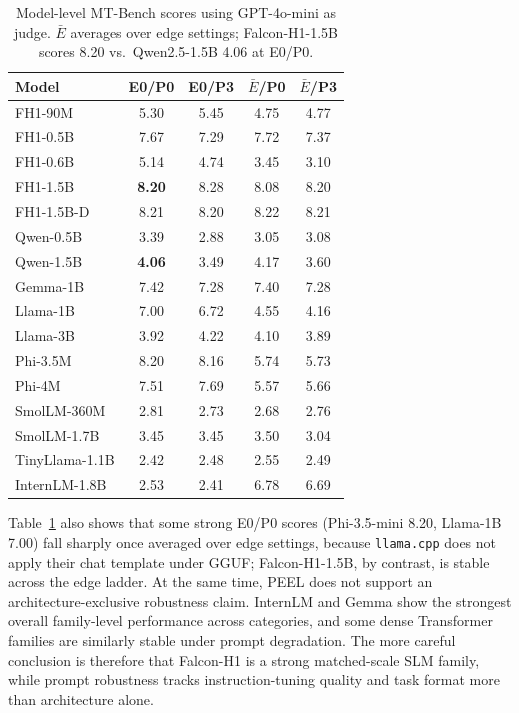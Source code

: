 \documentclass[letterpaper]{article} %
\begin{document}
\begin{table}[t]
\centering
\small
\setlength{\tabcolsep}{4pt}
\renewcommand{\arraystretch}{0.92}

\begin{tabular}{@{}lcccc@{}}
\toprule
Model & E0/P0 & E0/P3 & $\bar{E}$/P0 & $\bar{E}$/P3 \\
\midrule
FH1-90M        & 5.30 & 5.45 & 4.75 & 4.77 \\
FH1-0.5B       & 7.67 & 7.29 & 7.72 & 7.37 \\
FH1-0.6B       & 5.14 & 4.74 & 3.45 & 3.10 \\
FH1-1.5B       & \textbf{8.20} & 8.28 & 8.08 & 8.20 \\
FH1-1.5B-D     & 8.21 & 8.20 & 8.22 & 8.21 \\
Qwen-0.5B      & 3.39 & 2.88 & 3.05 & 3.08 \\
Qwen-1.5B      & \textbf{4.06} & 3.49 & 4.17 & 3.60 \\
Gemma-1B       & 7.42 & 7.28 & 7.40 & 7.28 \\
Llama-1B       & 7.00 & 6.72 & 4.55 & 4.16 \\
Llama-3B       & 3.92 & 4.22 & 4.10 & 3.89 \\
Phi-3.5M       & 8.20 & 8.16 & 5.74 & 5.73 \\
Phi-4M         & 7.51 & 7.69 & 5.57 & 5.66 \\
SmolLM-360M    & 2.81 & 2.73 & 2.68 & 2.76 \\
SmolLM-1.7B    & 3.45 & 3.45 & 3.50 & 3.04 \\
TinyLlama-1.1B & 2.42 & 2.48 & 2.55 & 2.49 \\
InternLM-1.8B  & 2.53   & 2.41   & 6.78 & 6.69 \\
\bottomrule
\end{tabular}
\caption{Model-level MT-Bench scores using GPT-4o-mini as judge. $\bar{E}$ averages over edge settings; Falcon-H1-1.5B scores 8.20 vs.\ Qwen2.5-1.5B 4.06 at E0/P0.}

\label{tab:mtbench-model}
\end{table}

Table~\ref{tab:mtbench-model} also shows that some strong E0/P0 scores
(Phi-3.5-mini 8.20, Llama-1B 7.00) fall sharply once averaged over edge
settings, because \texttt{llama.cpp} does not apply their chat template under
GGUF; Falcon-H1-1.5B, by contrast, is stable across the edge ladder. At the same time, PEEL does
not support an architecture-exclusive robustness claim. InternLM and Gemma show
the strongest overall family-level performance across categories, and some
dense Transformer families are similarly stable under prompt degradation. The
more careful conclusion is therefore that Falcon-H1 is a strong matched-scale
SLM family, while prompt robustness tracks instruction-tuning quality and task
format more than architecture alone.
\end{document}
